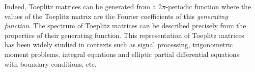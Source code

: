 Indeed, Toeplitz matrices can be generated from a 2$\pi$-periodic function where the values of the Toeplitz matrix are the Fourier coefficients of this \emph{generating function}.
The spectrum of Toeplitz matrices can be described precisely from the properties of their generating function.
This representation of Toeplitz matrices has been widely studied in contexts such as signal processing, trigonometric moment problems, integral equations and elliptic partial differential equations with boundary conditions, etc. \cite{serra1997extension,parter1961extreme,avram1988bilinear,widom1965toeplitz,tilli1997asymptotic,tyrtyshnikov1998spectra,tilli1998singular,tilli1997asymptotic} 



%
%
%
%



